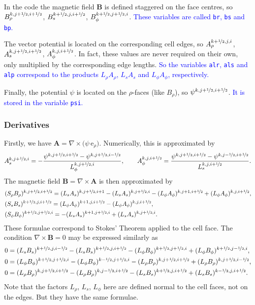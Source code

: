 \documentclass[11pt]{article}
\newcommand{\half}{\nicefrac{1}{2}}
\newcommand{\Ab}{\boldsymbol{A}}
\newcommand{\Bb}{\boldsymbol{B}}
\newcommand{\evr}{\,\mathrm{e}_\rho}
\begin{document}
In the code the magnetic field $\Bb$ is defined staggered on the face centres, so $B_\rho^{k,j+\half,i+\half}$, $B_s^{k+\half,j,i+\half}$, $B_\phi^{k+\half,j+\half,i}$. \textcolor{blue}{These variables are called \texttt{br}, \texttt{bs} and \texttt{bp}.}

The vector potential is located on the corresponding cell edges, so $A_\rho^{k+\half,j,i}$, $A_s^{k,j+\half,i+\half}$, $A_\phi^{k,j,i+\half}$. In fact, these values are never required on their own, only multiplied by the corresponding edge lengths. \textcolor{blue}{So the variables \texttt{alr}, \texttt{als} and \texttt{alp} correspond to the products $L_\rho A_\rho$, $L_sA_s$ and $L_\phi A_\phi$, respectively.}

Finally, the potential $\psi$ is located on the $\rho$-faces (like $B_\rho$), so $\psi^{k,j+\half,i+\half}$. \textcolor{blue}{It is stored in the variable \texttt{psi}.}

\subsubsection{Derivatives}

Firstly, we have $\Ab = \nabla\times\big(\psi\evr\big)$. Numerically, this is approximated by
\begin{equation}
A_s^{k,j+\half,i} = -\frac{\psi^{k,j+\half,i+\half} - \psi^{k,j+\half,i-\half}}{L_\phi^{k,j+\half,i}}, \qquad A_\phi^{k,j,i+\half} = \frac{\psi^{k,j+\half,i+\half} - \psi^{k,j-\half,i+\half}}{L_s^{k,j,i+\half}}.
\label{eqn:as}
\end{equation}
The magnetic field $\Bb = \nabla\times\Ab$ is then approximated by
\begin{align}
&(S_\rho B_\rho)^{k,j+\half,i+\half} = (L_s A_s)^{k,j+\half,i+1} - (L_s A_s)^{k,j+\half,i} - (L_\phi A_\phi)^{k,j+1,i+\half} + (L_\phi A_\phi)^{k,j,i+\half},\\
&(S_s B_s)^{k+\half,j,i+\half} = (L_\phi A_\phi)^{k+1,j,i+\half} - (L_\phi A_\phi)^{k,j,i+\half},\\
&(S_\phi B_\phi)^{k+\half,j+\half,i} =  - (L_s A_s)^{k+1,j+\half,i} + (L_s A_s)^{k,j+\half,i}. \label{eqn:bp}
\end{align}
These formulae correspond to Stokes' Theorem applied to the cell face.
The condition $\nabla\times\Bb=0$ may be expressed similarly as
\begin{align}
&0 = (L_s B_s)^{k+\half,j,i-\half} - (L_s B_s)^{k+\half,j,i+\half} - (L_\phi B_\phi)^{k+\half,j+\half,i} + (L_\phi B_\phi)^{k+\half,j-\half,i},\label{eqn:j1}\\
&0 = (L_\phi B_\phi)^{k+\half,j+\half,i} - (L_\phi B_\phi)^{k-\half,j+\half,i} - (L_\rho B_\rho)^{k,j+\half,i+\half} + (L_\rho B_\rho)^{k,j+\half,i-\half},\label{eqn:j2}\\
&0 = (L_\rho B_\rho)^{k,j+\half,i+\half} - (L_\rho B_\rho)^{k,j-\half,i+\half} - (L_s B_s)^{k+\half,j,i+\half} + (L_s B_s)^{k-\half,j,i+\half}.\label{eqn:j3}
\end{align}
Note that the factors $L_\rho$, $L_s$, $L_\phi$ here are defined normal to the cell faces, not on the edges. But they have the same formulae.
\end{document}
